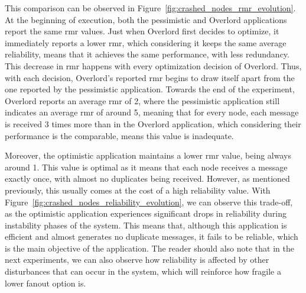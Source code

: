 This comparison can be observed in Figure~\ref{fig:crashed_nodes_rmr_evolution}. At the beginning of execution, both the pessimistic and Overlord applications report the same \gls{rmr} values. Just when Overlord first decides to optimize, it immediately reports a lower \gls{rmr}, which considering it keeps the same average reliability, means that it achieves the same performance, with less redundancy. This decrease in \gls{rmr} happens with every optimization decision of Overlord. Thus, with each decision, Overlord's reported \gls{rmr} begins to draw itself apart from the one reported by the pessimistic application. Towards the end of the experiment, Overlord reports an average \gls{rmr} of 2, where the pessimistic application still indicates an average \gls{rmr} of around 5, meaning that for every node, each message is received 3 times more than in the Overlord application, which considering their performance is the comparable, means this value is inadequate.

Moreover, the optimistic application maintains a lower \gls{rmr} value, being always around 1. This value is optimal as it means that each node receives a message exactly once, with almost no duplicates being received. However, as mentioned previously, this usually comes at the cost of a high reliability value. With Figure~\ref{fig:crashed_nodes_reliability_evolution}, we can observe this trade-off, as the optimistic application experiences significant drops in reliability during instability phases of the system. This means that, although this application is efficient and almost generates no duplicate messages, it fails to be reliable, which is the main objective of the application. The reader should also note that in the next experiments, we can also observe how reliability is affected by other disturbances that can occur in the system, which will reinforce how fragile a lower fanout option is.

